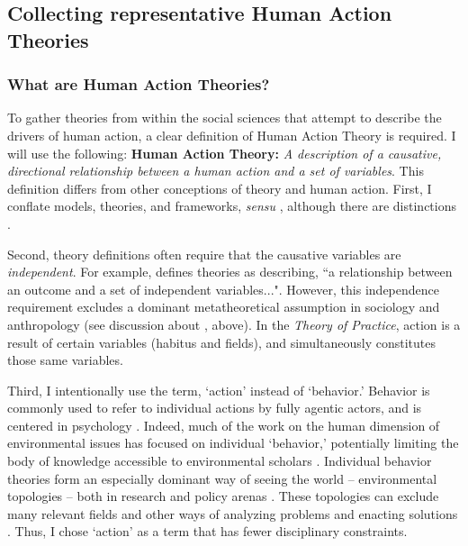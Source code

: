 \documentclass[12 pt]{article}
\begin{document}
\subsection{Collecting representative Human Action Theories}
	\subsubsection{What are Human Action Theories?} 
	To gather theories from within the social sciences that attempt to describe the drivers of human action, a clear definition of Human Action Theory is required. I will use the following: \textbf{Human Action Theory:}  \textit{A description of a causative, directional relationship between a human action and a set of variables}. This definition differs from other conceptions of theory and human action. First, I conflate models, theories, and frameworks, \textit{sensu} \textcite{Littlejohn1983}, although there are distinctions \parencite{Hawes1975,Cox2016}. 
	
	Second, theory definitions often require that the causative variables are \textit{independent}. For example,  \textcite[][p. 47]{Cox2016} defines theories as describing, ``a relationship between an outcome and a set of independent variables...". However, this independence requirement excludes a dominant metatheoretical assumption in sociology and anthropology (see discussion about \textcite{Davis2015}, above). In the \textit{Theory of Practice}, action is a result of certain variables (habitus and fields), and simultaneously constitutes those same variables.
	
	Third, I intentionally use the term, `action' instead of `behavior.' Behavior is commonly used to refer to individual actions by fully agentic actors, and is centered in psychology  \parencite[e.g.,][]{Stern2000}. Indeed, much of the work on the human dimension of environmental issues has focused on individual `behavior,'  potentially limiting the body of knowledge accessible to environmental scholars \parencite{Shove2010}. Individual behavior theories form an especially dominant way of seeing the world -- environmental topologies -- both in research and policy arenas \parencite{Shove2010}. These topologies can exclude many relevant fields and other ways of analyzing problems and enacting solutions \parencite{Brosius1999}. Thus, I chose `action' as a term that has fewer disciplinary constraints. 
\end{document}
